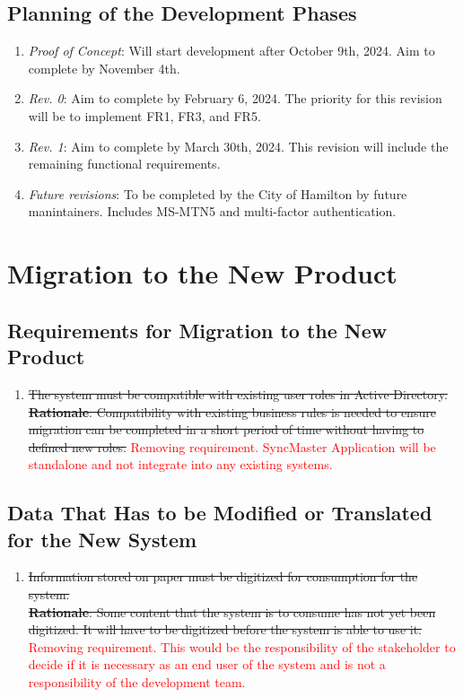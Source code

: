 \documentclass[12pt]{article}
\begin{document}
\subsection{Planning of the Development Phases}
\begin{enumerate}
  \item \textit{Proof of Concept}: Will start development after
    October 9th, 2024. Aim to complete by November 4th.
  \item \textit{Rev. 0}: Aim to complete by February 6, 2024. The
    priority for this revision will be to implement FR1, FR3, and FR5.
  \item \textit{Rev. 1}: Aim to complete by March 30th, 2024. This
    revision will include the remaining functional requirements.
  \item \textit{Future revisions}: To be completed by the City of
    Hamilton by future manintainers. Includes MS-MTN5
    and multi-factor authentication.
\end{enumerate}

\section{Migration to the New Product}
\subsection{Requirements for Migration to the New Product}
\begin{enumerate} [{MI-NP}1.]
  \item \sout{The system must be compatible with existing user roles in Active
      Directory.\\
      \textbf{Rationale}: Compatibility with existing business rules is needed
      to ensure migration can be completed in a short period of time without
    having to defined new roles.}
    \textcolor{red}{Removing requirement. SyncMaster Application will
    be standalone and not integrate into any existing systems.}
\end{enumerate}

\subsection{Data That Has to be Modified or Translated for the New System}
\begin{enumerate} [{MI-TR}1.]
  \item \sout{Information stored on paper must be digitized for
      consumption for the
      system.\\
      \textbf{Rationale}: Some content that the system is to consume has not yet
      been digitized. It will have to be digitized before the system is able to
    use it.}
    \textcolor{red}{Removing requirement. This would be the
      responsibility of the stakeholder to decide if it is necessary as
      an end user of the system and is not a responsibility of the
    development team.}
\end{enumerate}
\end{document}
